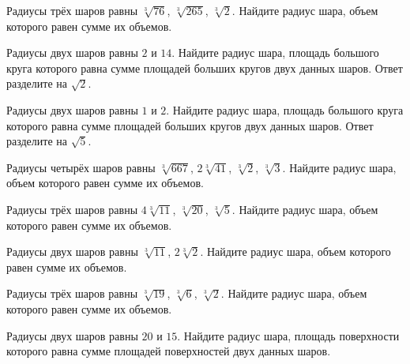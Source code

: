 \documentclass[a4paper]{article}
\begin{document}
\begin{taskBN}{57}
Радиусы трёх шаров равны $\sqrt[3]{76}$, $\sqrt[3]{265}$, $\sqrt[3]{2}$. Найдите радиус шара, объем которого равен сумме их объемов.
\end{taskBN}

\begin{taskBN}{58}
Радиусы двух шаров равны $2$ и $14$. Найдите радиус шара, площадь большого круга которого равна сумме площадей больших кругов двух данных шаров. Ответ разделите на $\sqrt{2}$.
\end{taskBN}

\begin{taskBN}{59}
Радиусы двух шаров равны $1$ и $2$. Найдите радиус шара, площадь большого круга которого равна сумме площадей больших кругов двух данных шаров. Ответ разделите на $\sqrt{5}$.
\end{taskBN}

\begin{taskBN}{60}
Радиусы четырёх шаров равны $\sqrt[3]{667}$, $2\sqrt[3]{41}$, $\sqrt[3]{2}$, $\sqrt[3]{3}$. Найдите радиус шара, объем которого равен сумме их объемов.
\end{taskBN}

\begin{taskBN}{61}
Радиусы трёх шаров равны $4\sqrt[3]{11}$, $\sqrt[3]{20}$, $\sqrt[3]{5}$. Найдите радиус шара, объем которого равен сумме их объемов.
\end{taskBN}

\begin{taskBN}{62}
Радиусы двух шаров равны $\sqrt[3]{11}$, $2\sqrt[3]{2}$. Найдите радиус шара, объем которого равен сумме их объемов.
\end{taskBN}

\begin{taskBN}{63}
Радиусы трёх шаров равны $\sqrt[3]{19}$, $\sqrt[3]{6}$, $\sqrt[3]{2}$. Найдите радиус шара, объем которого равен сумме их объемов.
\end{taskBN}

\begin{taskBN}{64}
Радиусы двух шаров равны $20$ и $15$. Найдите радиус шара, площадь поверхности которого равна сумме площадей поверхностей двух данных шаров.
\end{taskBN}
\end{document}
